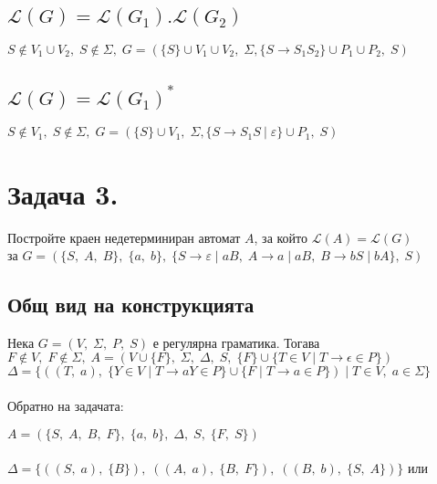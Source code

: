 \documentclass[12pt]{article}
\newcommand{\Lang}{\mathcal{L}}
\begin{document}
\subsection{$\Lang(G) = \Lang(G_1).\Lang(G_2)$}

$S \notin V_1 \cup V_2, \; S \notin \Sigma, \; G = (\{S\} \cup V_1 \cup V_2, \; \Sigma, \{S \to S_1S_2\} \cup P_1 \cup P_2, \; S)$

\subsection{$\Lang(G) = \Lang(G_1)^*$}

$S \notin V_1, \; S \notin \Sigma, \; G = (\{S\} \cup V_1, \; \Sigma, \{S \to S_1S \: | \; \varepsilon\} \cup P_1, \; S)$

\section{Задача 3.}

Постройте краен недетерминиран автомат $A$, за който $\Lang(A) = \Lang(G)$ \\

за $G = (\{S, \; A, \; B\}, \; \{a, \; b\}, \; \{S \to \varepsilon \; | \; aB, \; A \to a \; | \; aB, \; B \to bS \; | \; bA\}, \; S)$ \\

\subsection{Общ вид на конструкцията}

Нека $G = (V, \; \Sigma, \; P, \; S)$ е регулярна граматика. Тогава \\

$F \notin V, \; F \notin \Sigma,  \; A = (V \cup \{F\}, \; \Sigma, \; \Delta, \; S, \; \{F\} \cup \{T \in V \; | \; T \to \epsilon \in P \})$ \\

$\Delta = \{((T, \; a), \; \{Y \in V \; | \; T \to aY \in P\} \cup \{F \; | \; T \to a \in P\}) \; | \; T \in V, \; a \in \Sigma\}$ \\\\

Обратно на задачата:

$A = (\{S, \; A, \; B, \; F\}, \; \{a, \; b\}, \; \Delta, \; S, \; \{F, \; S\})$ \\\\

$\Delta = \{((S, \; a), \; \{B\}), \; ((A, \; a), \; \{B, \; F\}), \; ((B, \; b), \; \{S, \; A\})\}$ или \\\\
\end{document}
